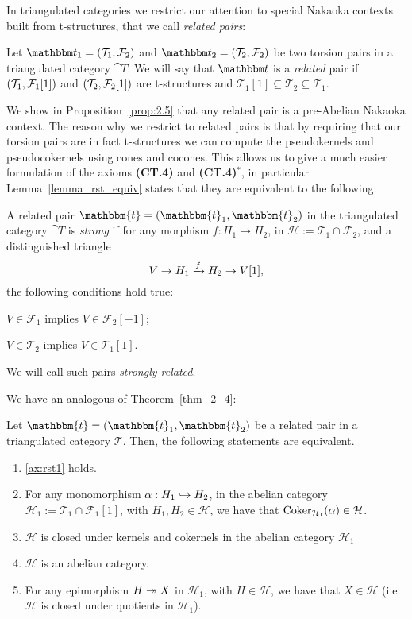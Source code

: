In triangulated categories we restrict our attention to special Nakaoka contexts built from t-structures, that we call \emph{related pairs}:
\begin{nonlisting_def}[\ref{def:related_pair}]
  Let $\t_1=(\T_1,\F_2)$ and $\t_2=(\T_2,\F_2)$ be two torsion pairs in a triangulated category $\cat{T}$.
  We will say that $\t$ is a \emph{related} pair if $(\mathcal{T}_1,\mathcal{F}_1[1])$ and $(\mathcal{T}_2,\mathcal{F}_2[1])$ are t-structures and
  $\mathcal{T}_1[1]\subseteq \mathcal{T}_2\subseteq\mathcal{T}_1$.
\end{nonlisting_def}

We show in Proposition~\ref{prop:2.5} that any related pair is a pre-Abelian Nakaoka context. The reason why we restrict to related pairs is that by requiring that our torsion pairs are in fact t-structures we can compute the pseudokernels and pseudocokernels using cones and cocones. This allows us to give a much easier formulation of the axioms \textbf{(CT.4)} and \textbf{(CT.4)$^\ast$}, in particular Lemma~\ref{lemma_rst_equiv} states that they are equivalent to the following:

\begin{nonlisting_def}[\ref{def:strongly_related}]
  A related pair $\mathbbm{t}=(\mathbbm{t}_1,\mathbbm{t}_2)$ in the triangulated category
  $\cat{T}$ is \emph{strong} if for any morphism $f:H_1\to H_2$, in $\mathcal{H}:=\mathcal{T}_1\cap\mathcal{F}_2$,
  and a distinguished triangle \[ V\to H_1\xrightarrow{f}H_2\to V[1],\] the following conditions
  hold true:
  \begin{relatedtorsion}
  \item $V\in\mathcal{F}_1$ implies $V\in\mathcal{F}_2[-1]$;
  \item $V\in\mathcal{T}_2$ implies $V\in\mathcal{T}_1[1]$.
  \end{relatedtorsion}

  We will call such pairs \emph{strongly related}.
\end{nonlisting_def}

We have an analogous of Theorem~\ref{thm_2_4}:
\begin{nonlisting_thm}[\ref{thm:2.9}]
  Let $\mathbbm{t}=(\mathbbm{t}_1,\mathbbm{t}_2)$ be a related pair in a triangulated
  category $\mathcal{T}$. Then, the following statements are equivalent.
  \begin{enumerate}[label=(\alph*)]
    \item \ref{ax:rst1} holds.
    \item For any monomorphism $\alpha:H_1\hookrightarrow H_2$, in the abelian category
      $\mathcal{H}_1:=\mathcal{T}_1\cap\mathcal{F}_1[1]$, with $H_1,H_2\in\mathcal{H}$,
      we have that $\operatorname{Coker}_{\mathcal{H}_1}(\alpha)\in\mathcal{H}$.
    \item $\mathcal{H}$ is closed under kernels and cokernels in the abelian category
      $\mathcal{H}_1$
    \item $\mathcal{H}$ is an abelian category.
    \item For any epimorphism $H\twoheadrightarrow X$ in $\mathcal{H}_1$, with $H\in\mathcal{H}$,
      we have that $X\in\mathcal{H}$ (i.e. $\mathcal{H}$ is closed under quotients in $\mathcal{H}_1$).
  \end{enumerate}
\end{nonlisting_thm}

